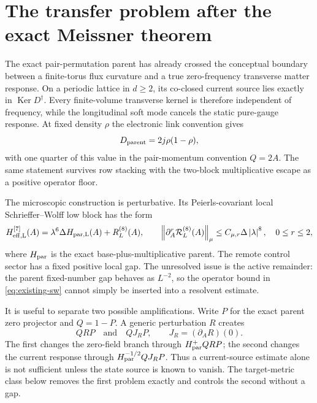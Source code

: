 \documentclass[11pt]{article}
\theoremstyle{definition}
\theoremstyle{remark}
\newcommand{\cR}{\mathcal R}
\newcommand{\Ker}{\operatorname{Ker}}
\newcommand{\norm}[1]{\left\lVert #1\right\rVert}
\newcommand{\abs}[1]{\left\lvert #1\right\rvert}
\begin{document}
\section{The transfer problem after the exact Meissner theorem}

The exact pair-permutation parent has already crossed the conceptual boundary
between a finite-torus flux curvature and a true zero-frequency transverse
matter response.  On a periodic lattice in $d\ge2$, its co-closed current
source lies exactly in $\Ker D^\dagger$.  Every finite-volume transverse kernel
is therefore independent of frequency, while the longitudinal soft mode
cancels the static pure-gauge response.  At fixed density $\rho$ the electronic
link convention gives
\begin{equation}
 D_{\rm parent}=2j\rho(1-\rho),
 \label{eq:parent-weight}
\end{equation}
with one quarter of this value in the pair-momentum convention $Q=2A$.  The
same statement survives row stacking with the two-block multiplicative escape
as a positive operator floor.

The microscopic construction is perturbative.  Its Peierls-covariant local
Schrieffer--Wolff low block has the form
\begin{equation}
 H_{\rm eff,L}^{[7]}(A)
 =\lambda^6\Delta H_{\rm par,L}(A)+R_L^{(8)}(A),
 \qquad
 \norm{\partial_A^r\cR_L^{(8)}(A)}_\mu
 \le C_{\mu,r}\Delta\abs\lambda^8,
 \quad 0\le r\le2,
 \label{eq:existing-sw}
\end{equation}
where $H_{\rm par}$ is the exact base-plus-multiplicative parent.  The remote
control sector has a fixed positive local gap.  The unresolved issue is the
active remainder: the parent fixed-number gap behaves as $L^{-2}$, so the
operator bound in \eqref{eq:existing-sw} cannot simply be inserted into a
resolvent estimate.

It is useful to separate two possible amplifications.  Write $P$ for the exact
parent zero projector and $Q=1-P$.  A generic perturbation $R$ creates
\begin{equation}
 QRP \quad\text{and}\quad QJ_RP,
 \qquad J_R=(\partial_A R)(0).
 \label{eq:two-sources}
\end{equation}
The first changes the zero-field branch through $H_{\rm par}^+QRP$; the second
changes the current response through $H_{\rm par}^{-1/2}QJ_RP$.  Thus a
current-source estimate alone is not sufficient unless the state source is
known to vanish.  The target-metric class below removes the first problem
exactly and controls the second without a gap.
\end{document}
